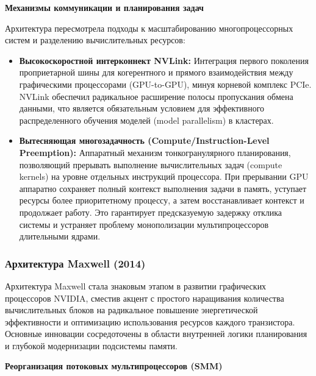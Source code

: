 \documentclass{article}[14pt]
\begin{document}
\medskip \noindent \textbf{Механизмы коммуникации и планирования задач}

Архитектура пересмотрела подходы к масштабированию многопроцессорных систем и разделению вычислительных ресурсов:
\begin{itemize}
    \item \textbf{Высокоскоростной интерконнект NVLink:} Интеграция первого поколения проприетарной шины для когерентного и прямого взаимодействия между графическими процессорами (GPU-to-GPU), минуя корневой комплекс PCIe. NVLink обеспечил радикальное расширение полосы пропускания обмена данными, что является обязательным условием для эффективного распределенного обучения моделей (model parallelism) в кластерах.
    \item \textbf{Вытесняющая многозадачность (Compute/Instruction-Level Preemption):} Аппаратный механизм тонкогранулярного планирования, позволяющий прерывать выполнение вычислительных задач (compute kernels) на уровне отдельных инструкций процессора. При прерывании GPU аппаратно сохраняет полный контекст выполнения задачи в память, уступает ресурсы более приоритетному процессу, а затем восстанавливает контекст и продолжает работу. Это гарантирует предсказуемую задержку отклика системы и устраняет проблему монополизации мультипроцессоров длительными ядрами.
\end{itemize}

\subsubsection{Архитектура Maxwell (2014)}

Архитектура Maxwell стала знаковым этапом в развитии графических процессоров NVIDIA, сместив акцент с простого наращивания количества вычислительных блоков на радикальное повышение энергетической эффективности и оптимизацию использования ресурсов каждого транзистора. Основные инновации сосредоточены в области внутренней логики планирования и глубокой модернизации подсистемы памяти.

\medskip \noindent \textbf{Реорганизация потоковых мультипроцессоров (SMM)}
\end{document}
